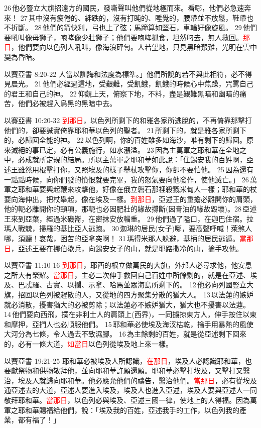 26 他必豎立大旗招遠方的國民，發嘶聲叫他們從地極而來。看哪，他們必急速奔來！ 27 其中沒有疲倦的、絆跌的，沒有打盹的、睡覺的，腰帶並不放鬆，鞋帶也不折斷。 28 他們的箭快利，弓也上了弦；馬蹄算如堅石，車輪好像旋風。 29 他們要吼叫像母獅子，咆哮像少壯獅子；他們要咆哮抓食，坦然叼去，無人救回。\textcolor{red}{那日}，他們要向以色列人吼叫，像海浪砰訇。人若望地，只見黑暗艱難，光明在雲中變為昏暗。

以賽亞書 8:20-22
人當以訓誨和法度為標準。」他們所說的若不與此相符，必不得見晨光。 21 他們必經過這地，受艱難，受飢餓，飢餓的時候心中焦躁，咒罵自己的君王和自己的神。 22 仰觀上天，俯察下地，不料，盡是艱難黑暗和幽暗的痛苦，他們必被趕入烏黑的黑暗中去。

以賽亞書 10:20-32
\textcolor{red}{到那日}，以色列所剩下的和雅各家所逃脫的，不再倚靠那擊打他們的，卻要誠實倚靠耶和華以色列的聖者。 21 所剩下的，就是雅各家所剩下的，必歸回全能的神。 22 以色列啊，你的百姓雖多如海沙，唯有剩下的歸回。原來滅絕的事已定，必有公義施行，如水漲溢。 23 因為主萬軍之耶和華在全地之中，必成就所定規的結局。所以主萬軍之耶和華如此說：「住錫安我的百姓啊，亞述王雖然用棍擊打你，又照埃及的樣子舉杖攻擊你，你卻不要怕他。 25 因為還有一點點時候，向你們發的憤恨就要完畢，我的怒氣要向他發作，使他滅亡。」 26 萬軍之耶和華要興起鞭來攻擊他，好像在俄立磐石那裡殺戮米甸人一樣；耶和華的杖要向海伸出，把杖舉起，像在埃及一樣。\textcolor{red}{到那日}，亞述王的重擔必離開你的肩頭，他的軛必離開你的頸項，那軛也必因肥壯的緣故撐斷(因膏油的緣故毀壞)。28 亞述王來到亞葉，經過米磯崙，在密抹安放輜重。 29 他們過了隘口，在迦巴住宿。拉瑪人戰兢，掃羅的基比亞人逃跑。 30 迦琳的居民(女子)哪，要高聲呼喊！萊煞人哪，須聽！哀哉，困苦的亞拿突啊！ 31 瑪得米那人躲避，基柄的居民逃遁。\textcolor{red}{當那日}，亞述王要在挪伯歇兵，向錫安女子的山，就是耶路撒冷的山，掄手攻他。

以賽亞書 11:10-16
\textcolor{red}{到那日}，耶西的根立做萬民的大旗，外邦人必尋求他，他安息之所大有榮耀。\textcolor{red}{當那日}，主必二次伸手救回自己百姓中所餘剩的，就是在亞述、埃及、巴忒羅、古實、以攔、示拿、哈馬並眾海島所剩下的。 12 他必向列國豎立大旗，招回以色列被趕散的人，又從地的四方聚集分散的猶大人。 13 以法蓮的嫉妒就必消散，擾害猶大的必被剪除；以法蓮必不嫉妒猶大，猶大也不擾害以法蓮。 14 他們要向西飛，撲在非利士人的肩頭上(西界)，一同擄掠東方人，伸手按住以東和摩押，亞捫人也必順服他們。 15 耶和華必使埃及海汊枯乾，掄手用暴熱的風使大河分為七條，令人過去不致濕腳。 16 為主餘剩的百姓，就是從亞述剩下回來的，必有一條大道，\textcolor{red}{如當日}以色列從埃及地上來一樣。

以賽亞書 19:21-25
耶和華必被埃及人所認識，\textcolor{red}{在那日}，埃及人必認識耶和華，也要獻祭物和供物敬拜他，並向耶和華許願還願。耶和華必擊打埃及，又擊打又醫治，埃及人就歸向耶和華。他必應允他們的禱告，醫治他們。\textcolor{red}{當那日}，必有從埃及通亞述去的大道，亞述人要進入埃及，埃及人也進入亞述，埃及人要與亞述人一同敬拜耶和華。\textcolor{red}{當那日}，以色列必與埃及、亞述三國一律，使地上的人得福。因為萬軍之耶和華賜福給他們，說：「埃及我的百姓，亞述我手的工作，以色列我的產業，都有福了！」


